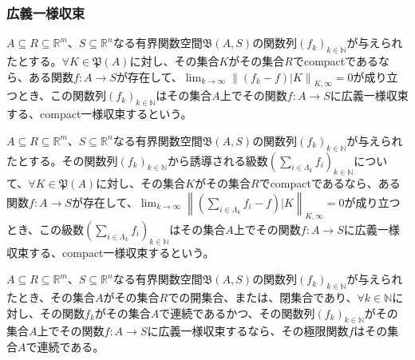 \documentclass[dvipdfmx]{jsarticle}
\begin{document}
\subsubsection{広義一様収束}%
\begin{dfn}
$A \subseteq R \subseteq \mathbb{R}^{m}$、$S \subseteq \mathbb{R}^{n}$なる有界関数空間$\mathfrak{B}(A,S)$の関数列$\left( f_{k} \right)_{k \in \mathbb{N}}$が与えられたとする。$\forall K \in \mathfrak{P}(A)$に対し、その集合$K$がその集合$R$でcompactであるなら、ある関数$f:A \rightarrow S$が存在して、$\lim_{k \rightarrow \infty}\left\| \left( f_{k} - f \right)|K \right\|_{K,\infty} = 0$が成り立つとき、この関数列$\left( f_{k} \right)_{k \in \mathbb{N}}$はその集合$A$上でその関数$f:A \rightarrow S$に広義一様収束する、compact一様収束するという。
\end{dfn}
\begin{dfn}
$A \subseteq R \subseteq \mathbb{R}^{m}$、$S \subseteq \mathbb{R}^{n}$なる有界関数空間$\mathfrak{B}(A,S)$の関数列$\left( f_{k} \right)_{k \in \mathbb{N}}$が与えられたとする。その関数列$\left( f_{k} \right)_{k \in \mathbb{N}}$から誘導される級数$\left( \sum_{i \in \varLambda_{k}} f_{i} \right)_{k \in \mathbb{N}}$について、$\forall K \in \mathfrak{P}(A)$に対し、その集合$K$がその集合$R$でcompactであるなら、ある関数$f:A \rightarrow S$が存在して、$\lim_{k \rightarrow \infty}\left\| \left( \sum_{i \in \varLambda_{k}} f_{i} - f \right)|K \right\|_{K,\infty} = 0$が成り立つとき、この級数$\left( \sum_{i \in \varLambda_{k}} f_{i} \right)_{k \in \mathbb{N}}$はその集合$A$上でその関数$f:A \rightarrow S$に広義一様収束する、compact一様収束するという。
\end{dfn}
\begin{thm}\label{4.1.11.9}
$A \subseteq R \subseteq \mathbb{R}^{m}$、$S \subseteq \mathbb{R}^{n}$なる有界関数空間$\mathfrak{B}(A,S)$の関数列$\left( f_{k} \right)_{k \in \mathbb{N}}$が与えられたとき、その集合$A$がその集合$R$での開集合、または、閉集合であり、$\forall k \in \mathbb{N}$に対し、その関数$f_{k}$がその集合$A$で連続であるかつ、その関数列$\left( f_{k} \right)_{k \in \mathbb{N}}$がその集合$A$上でその関数$f:A \rightarrow S$に広義一様収束するなら、その極限関数$f$はその集合$A$で連続である。
\end{thm}
\end{document}
